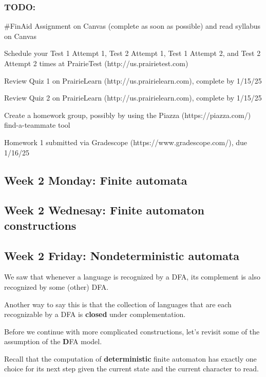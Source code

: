 \vspace{-50pt}

\subsubsection*{TODO:}
\begin{list}{\itemsep-10pt}
   \item \#FinAid Assignment on Canvas (complete as soon as possible) and read syllabus on Canvas
   \item Schedule your Test 1 Attempt 1, Test 2 Attempt 1, Test 1 Attempt 2, and Test 2 Attempt 2 times 
   at PrairieTest (http://us.prairietest.com)
   \item Review Quiz 1 on PrairieLearn (http://us.prairielearn.com), complete by 1/15/25
   \item Review Quiz 2 on PrairieLearn (http://us.prairielearn.com), complete by 1/15/25
   \item Create a homework group, possibly by using the Piazza (https://piazza.com/) find-a-teammate tool
   \item Homework 1 submitted via Gradescope (https://www.gradescope.com/), due 1/16/25
\end{list}


\newpage

\subsection*{Week 2 Monday: Finite automata}




\subsection*{Week 2 Wednesay: Finite automaton constructions}



\newpage
\subsection*{Week 2 Friday: Nondeterministic automata}

We saw that whenever a language is recognized by a DFA, its
complement is also recognized by some (other) DFA. 

Another way to say this is that the collection of languages
that are each recognizable by a DFA is {\bf closed} under complementation.


Before we continue with more complicated constructions, let's revisit some of 
the assumption of the {\bf D}FA model.

Recall that the computation of {\bf deterministic} finite automaton has exactly one choice for its next step given the current state and the current character to read.






